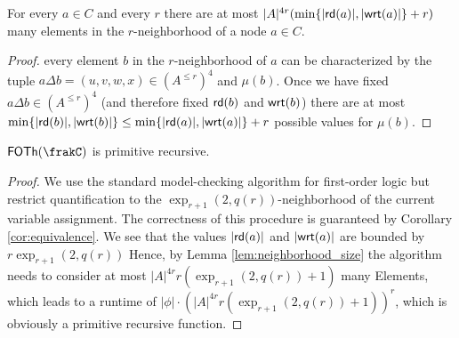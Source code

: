 


\begin{lemma}\label{lem:neighborhood_size}
	For every $a\in C$ and every $r$ there are at most $|A|^{4r} (\min\{|\mathsf{rd}(a)|, |\mathsf{wrt}(a)|\} + r)$ many elements in the $r$-neighborhood of a node $a\in C$. 
\end{lemma}
\begin{proof}
	every element $b$ in the $r$-neighborhood of $a$ can be characterized by the tuple $a\Delta b = (u,v, w, x)\in (A^{\leq r})^4$ and $\mu(b)$. Once we have  fixed  
	$a\Delta b \in (A^{\leq r})^4$ (and therefore fixed $\mathsf{rd}(b)$ and $\mathsf{wrt}(b)$) there are at most   $\min\{ |\mathsf{rd}(b)|, |\mathsf{wrt}(b)| \} \leq \min\{ |\mathsf{rd}(a)|, |\mathsf{wrt}(a)| \} + r$ possible values for $\mu(b)$.
\end{proof}

\begin{theorem}
	$\FOTh{\frakC}$ is primitive recursive.
\end{theorem}
\begin{proof}
	We use the standard model-checking algorithm for first-order logic but restrict quantification to the $\exp_{r+1}(2,q(r))$-neighborhood of the current variable assignment. The correctness of this procedure is guaranteed by Corollary \ref{cor:equivalence}.
	We see that the values $|\mathsf{rd}(a)|$ and $|\mathsf{wrt}(a)|$ are bounded by $r\exp_{r+1}(2,q(r))$
	Hence, by Lemma \ref{lem:neighborhood_size}  the algorithm needs to consider at most $|A|^{4r} r(\exp_{r+1}(2,q(r)) +1)$ many Elements, which leads to a runtime of
	$|\phi| \cdot (|A|^{4r} r(\exp_{r+1}(2,q(r)) +1))^r$, which is obviously a primitive recursive function. 
\end{proof}